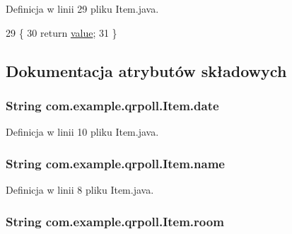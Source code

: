 Definicja w linii 29 pliku Item.\+java.


\begin{DoxyCode}
29                             \{
30         \textcolor{keywordflow}{return} \hyperlink{classcom_1_1example_1_1qrpoll_1_1_item_abc0a6b74f1923ca042b9b9d3b48f014c}{value};
31     \}
\end{DoxyCode}


\subsection{Dokumentacja atrybutów składowych}
\hypertarget{classcom_1_1example_1_1qrpoll_1_1_item_a47b12c3c00c7a7a9deddb47f139af3cc}{
\subsubsection[{date}]{\setlength{\rightskip}{0pt plus 5cm}String com.\+example.\+qrpoll.\+Item.\+date\hspace{0.3cm}{\ttfamily [private]}}}\label{classcom_1_1example_1_1qrpoll_1_1_item_a47b12c3c00c7a7a9deddb47f139af3cc}


Definicja w linii 10 pliku Item.\+java.

\hypertarget{classcom_1_1example_1_1qrpoll_1_1_item_a70600dc1190682886f0976b418f13a76}{
\subsubsection[{name}]{\setlength{\rightskip}{0pt plus 5cm}String com.\+example.\+qrpoll.\+Item.\+name\hspace{0.3cm}{\ttfamily [private]}}}\label{classcom_1_1example_1_1qrpoll_1_1_item_a70600dc1190682886f0976b418f13a76}


Definicja w linii 8 pliku Item.\+java.

\hypertarget{classcom_1_1example_1_1qrpoll_1_1_item_ad54518f2889a23bb19316b92711a655c}{
\subsubsection[{room}]{\setlength{\rightskip}{0pt plus 5cm}String com.\+example.\+qrpoll.\+Item.\+room\hspace{0.3cm}{\ttfamily [private]}}}\label{classcom_1_1example_1_1qrpoll_1_1_item_ad54518f2889a23bb19316b92711a655c}


